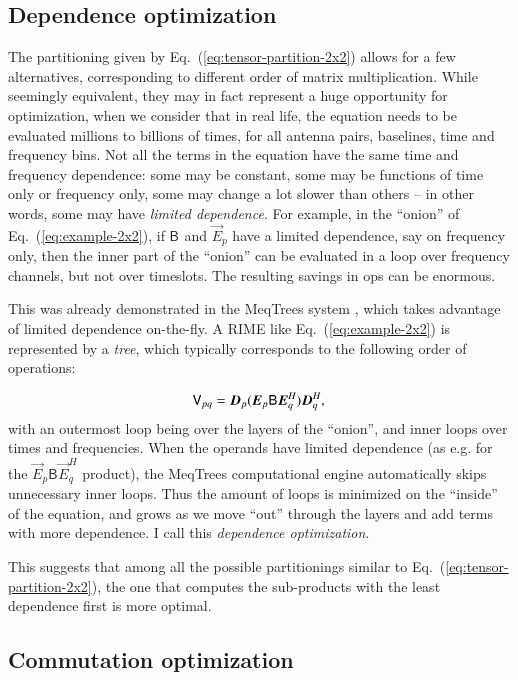 \documentclass{aa}
\newcommand{\herm}{H}
\newcommand{\jones}[2]{\vec {#1}_{#2}}
\newcommand{\jonesT}[2]{\vec {#1}^{\herm}_{#2}}
\newcommand{\coh}[2]{\mathsf{{#1}}_{{#2}}}
\begin{document}
\subsection{Dependence optimization}

The partitioning given by Eq.~(\ref{eq:tensor-partition-2x2}) allows for a few alternatives, corresponding to different order of matrix multiplication. While seemingly equivalent, they may in fact represent a huge opportunity for optimization, when we consider that in real life, 
the equation needs to be evaluated millions to billions of times, for all antenna pairs, baselines, time and frequency bins. Not all the terms in the equation have the same time and frequency dependence: some may be constant, some may be functions of time only or frequency only, some may change a lot slower than others -- in other words, some may have \emph{limited dependence}. For example, in the ``onion'' of Eq.~(\ref{eq:example-2x2}), if $\coh{B}{}$ and $\jones{E}{p}$ have a limited dependence, say on frequency only, then the inner part of the ``onion'' can be evaluated in a loop over frequency channels, but not over timeslots. The resulting savings in ops can be enormous.

This was already demonstrated in the MeqTrees system \citep{meqtrees}, which takes advantage of limited dependence on-the-fly. A RIME like Eq.~(\ref{eq:example-2x2}) is represented by a \emph{tree}, which typically corresponds to the following order of operations:

\[
  \coh{V}{pq} =  \jones{D}{p}(\jones{E}{p} \coh{B}{} \jonesT{E}{q} ) \jonesT{D}{q}, \\
\]
with an outermost loop being over the layers of the ``onion'', and inner loops over times and frequencies. When the operands have limited dependence (as e.g. for the $\jones{E}{p} \coh{B}{} \jonesT{E}{q}$ product), the MeqTrees computational engine automatically skips unnecessary inner loops. Thus the amount of loops is minimized on the ``inside'' of the equation, and grows as we move ``out'' through the layers and add terms with more dependence. I call this \emph{dependence optimization}. 

This suggests that among all the possible partitionings similar to Eq.~(\ref{eq:tensor-partition-2x2}), the one that computes the sub-products with the least dependence first is more optimal.

\subsection{Commutation optimization}
\end{document}
